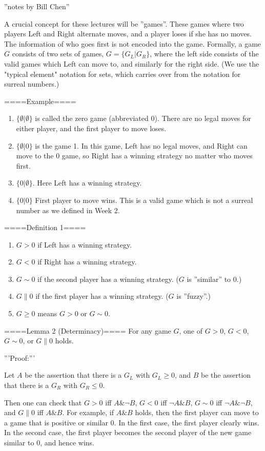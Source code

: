 
''notes by Bill Chen''

A crucial concept for these lectures will be ''games''. These games where two players Left and Right alternate moves, and a player loses if she has no moves. The information of who goes first is not encoded into the game. Formally, a game $G$ consists of two sets of games, $G=\{G_L|G_R\}$, where the left side consists of the valid games which Left can move to, and similarly for the right side. (We use the "typical element" notation for sets, which carries over from the notation for surreal numbers.)

====Example====
\begin{enumerate}
  \item  $\{\emptyset|\emptyset\}$ is called the zero game (abbreviated 0). There are no legal moves for either player, and the first player to move loses.
  \item  $\{\emptyset|0\}$ is the game 1. In this game, Left has no legal moves, and Right can move to the 0 game, so Right has a winning strategy no matter who moves first.
  \item  $\{0|\emptyset\}$. Here Left has a winning strategy.
  \item  $\{0|0\}$ First player to move wins. This is a valid game which is not a surreal number as we defined in Week 2.
\end{enumerate}
====Definition 1====
\begin{enumerate}
  \item  $G>0$ if Left has a winning strategy.
  \item  $G<0$ if Right has a winning strategy.
  \item  $G\sim 0$ if the second player has a winning strategy. ($G$ is ''similar'' to $0$.)
  \item  $G\parallel 0$ if the first player has a winning strategy. ($G$ is ''fuzzy''.)
  \item  $G\ge 0$ means $G>0$ or $G\sim 0$.
\end{enumerate}
====Lemma 2 (Determinacy)====
For any game $G$, one of $G>0$, $G<0$, $G\sim 0$, or $G\parallel 0$ holds.

'''Proof:'''

Let $A$ be the assertion that there is a $G_L$ with $G_L\ge 0$, and $B$ be the assertion that there is a $G_R$ with $G_R\le 0$.

Then one can check that $G>0$ iff $A\& \neg B$, $G<0$ iff $\neg A \& B$, $G\sim 0$ iff $\neg A \& \neg B$, and $G\parallel 0$ iff $A\& B$. For example, if $A \& B$ holds, then the first player can move to a game that is positive or similar $0$. In the first case, the first player clearly wins. In the second case, the first player becomes the second player of the new game similar to $0$, and hence wins.

